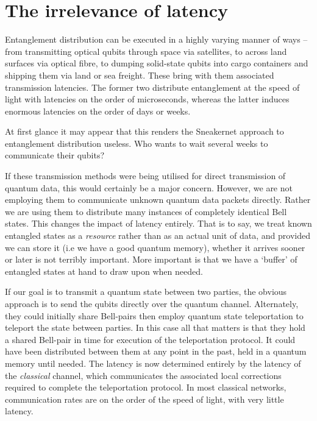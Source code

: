 %
%

\section{The irrelevance of latency}

Entanglement distribution can be executed in a highly varying manner of ways -- from transmitting optical qubits through space via satellites, to across land surfaces via optical fibre, to dumping solid-state qubits into cargo containers and shipping them via land or sea freight. These bring with them associated transmission latencies. The former two distribute entanglement at the speed of light with latencies on the order of microseconds, whereas the latter induces enormous latencies on the order of days or weeks.

At first glance it may appear that this renders the Sneakernet\texttrademark{} approach to entanglement distribution useless. Who wants to wait several weeks to communicate their qubits?

If these transmission methods were being utilised for direct transmission of quantum data, this would certainly be a major concern. However, we are not employing them to communicate unknown quantum data packets directly. Rather we are using them to distribute many instances of completely identical Bell states. This changes the impact of latency entirely. That is to say, we treat known entangled states as a \textit{resource} rather than as an actual unit of data, and provided we can store it (i.e we have a good quantum memory), whether it arrives sooner or later is not terribly important. More important is that we have a `buffer' of entangled states at hand to draw upon when needed.

If our goal is to transmit a quantum state between two parties, the obvious approach is to send the qubits directly over the quantum channel. Alternately, they could initially share Bell-pairs then employ quantum state teleportation to teleport the state between parties. In this case all that matters is that they hold a shared Bell-pair in time for execution of the teleportation protocol. It could have been distributed between them at any point in the past, held in a quantum memory until needed. The latency is now determined entirely by the latency of the \textit{classical} channel, which communicates the associated local corrections required to complete the teleportation protocol. In most classical networks, communication rates are on the order of the speed of light, with very little latency.

